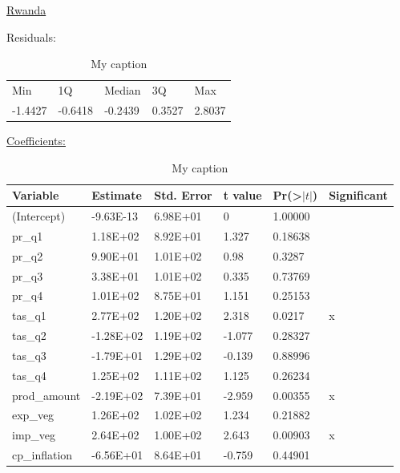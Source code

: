 \documentclass[12pt,a4paper,english]{article}
\begin{document}
\begin{center} \underline{Rwanda}\\ \end{center}
Residuals:
\FloatBarrier
\begin{table}[!htbp]
\centering

\begin{tabular}{lllll}
Min     & 1Q      & Median  & 3Q     & Max    \\
-1.4427 & -0.6418 & -0.2439 & 0.3527 & 2.8037
\end{tabular}
\caption{My caption}
\label{my-label}
\end{table}
\FloatBarrier

\underline{Coefficients:}
\FloatBarrier
\begin{table}[!htbp]
\centering
\begin{tabular}{llllll}
\hline
Variable      & Estimate  & Std. Error & t value & Pr(\textgreater$|t|$) & Significant \\ \hline
(Intercept)   & -9.63E-13 & 6.98E+01   & 0       & 1.00000             &             \\
pr\_q1        & 1.18E+02  & 8.92E+01   & 1.327   & 0.18638             &             \\
pr\_q2        & 9.90E+01  & 1.01E+02   & 0.98    & 0.3287              &             \\
pr\_q3        & 3.38E+01  & 1.01E+02   & 0.335   & 0.73769             &             \\
pr\_q4        & 1.01E+02  & 8.75E+01   & 1.151   & 0.25153             &             \\
tas\_q1       & 2.77E+02  & 1.20E+02   & 2.318   & 0.0217              & x           \\
tas\_q2       & -1.28E+02 & 1.19E+02   & -1.077  & 0.28327             &             \\
tas\_q3       & -1.79E+01 & 1.29E+02   & -0.139  & 0.88996             &             \\
tas\_q4       & 1.25E+02  & 1.11E+02   & 1.125   & 0.26234             &             \\
prod\_amount  & -2.19E+02 & 7.39E+01   & -2.959  & 0.00355             & x           \\
exp\_veg      & 1.26E+02  & 1.02E+02   & 1.234   & 0.21882             &             \\
imp\_veg      & 2.64E+02  & 1.00E+02   & 2.643   & 0.00903             & x           \\
cp\_inflation & -6.56E+01 & 8.64E+01   & -0.759  & 0.44901             &            \\ \hline
\end{tabular}
\caption{My caption}
\label{my-label}
\end{table}
\FloatBarrier
\end{document}
